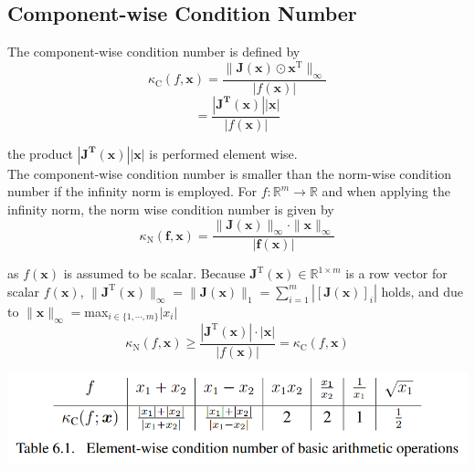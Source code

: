 \documentclass[english]{latex4ei/latex4ei_sheet}
\begin{document}
\begin{sectionbox}
\subsection{Component-wise Condition Number}
The component-wise condition number is defined by
$$\kappa_\text{C}(f,\mathbf{x}) = \frac{\parallel\mathbf{J}(\mathbf{x})\odot\mathbf{x}^\text{T}\parallel_\infty}{|f(\mathbf{x})|}$$
$$=\frac{|\mathbf{J^\text{T}(\mathbf{x})}||\mathbf{x}| }{|f(\mathbf{x})| }$$

the product $|\mathbf{J^\text{T}(\mathbf{x})}||\mathbf{x}|$ is performed  element wise.\\

The component-wise condition number is smaller than the norm-wise condition number if the infinity norm is employed. For $f:\mathbb{R}^m \to \mathbb{R}$ and when applying the infinity norm, the norm wise condition number is given by
$$\kappa_\text{N}(\mathbf{f}, \mathbf{x}) = \frac{\parallel \mathbf{J}(\mathbf{x})\parallel_\infty \cdot \parallel \mathbf{x} \parallel_\infty}{| \mathbf{f}(\mathbf{x})|}$$

as $f(\mathbf{x})$ is assumed to be scalar. Because $\mathbf{J}^\text{T}(\mathbf{x})\in\mathbb{R}^{1\times m}$ is a row vector for scalar $f(\mathbf{x})$, $\parallel\mathbf{J}^\text{T}(\mathbf{x})\parallel_\infty = \parallel \mathbf{J}(\mathbf{x})\parallel_1 = \sum_{i=1}^{m} \left|[\mathbf{J}(\mathbf{x})]_i\right|$ holds, and due to $\parallel \mathbf{x}\parallel_\infty = $max$_{i\in\{1,\cdots,m\}}|x_i|$\\

$$\kappa_\text{N}(f,\mathbf{x}) \geq \frac{|\mathbf{J}^\text{T}(\mathbf{x})|\cdot |\mathbf{x}|}{\left|f(\mathbf{x})\right|}=\kappa_\text{C}(f,\mathbf{x})$$

\end{sectionbox}
\begin{sectionbox}
\includegraphics[width=\textwidth]{img/kc_operations.PNG}
\end{sectionbox}
\end{document}
